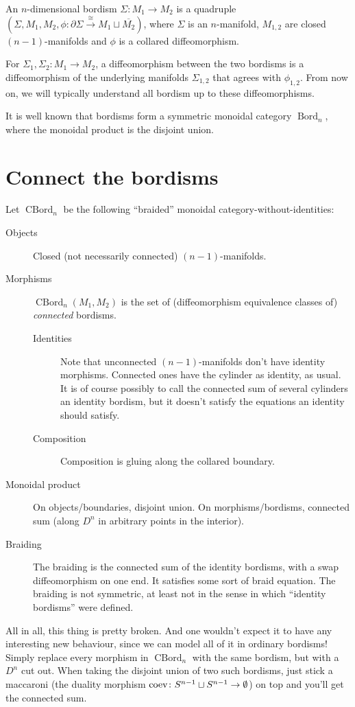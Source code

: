 \documentclass[a4paper]{article}
\begin{document}
\begin{definition}
	An $n$-dimensional bordism $\Sigma\colon M_1 \to M_2$ is a quadruple $(\Sigma, M_1, M_2, \phi\colon \partial \Sigma \xrightarrow{\cong} M_1 \sqcup \overline{M_2})$,
	where $\Sigma$ is an $n$-manifold, $M_{1,2}$ are closed $(n-1)$-manifolds and $\phi$ is a collared diffeomorphism.
	
	For $\Sigma_1, \Sigma_2\colon M_1 \to M_2$,
	a diffeomorphism between the two bordisms is a diffeomorphism of the underlying manifolds $\Sigma_{1,2}$ that agrees with $\phi_{1,2}$.
	From now on, we will typically understand all bordism up to these diffeomorphisms.
\end{definition}
It is well known that bordisms form a symmetric monoidal category $\operatorname{Bord}_n$,
where the monoidal product is the disjoint union.

\section{Connect the bordisms}
\label{sec:connect bordisms}

\begin{definition}
	Let $\operatorname{CBord}_n$ be the following ``braided'' monoidal category-without-identities:
	\begin{description}
		\item[Objects]
			Closed (not necessarily connected) $(n-1)$-manifolds.
		\item[Morphisms]
			$\operatorname{CBord}_n(M_1, M_2)$ is the set of (diffeomorphism equivalence classes of) \emph{connected} bordisms.
			\begin{description}
				\item[Identities]
					Note that unconnected $(n-1)$-manifolds don't have identity morphisms.
					Connected ones have the cylinder as identity, as usual.
					It is of course possibly to call the connected sum of several cylinders an identity bordism,
					but it doesn't satisfy the equations an identity should satisfy.
				\item[Composition]
					Composition is gluing along the collared boundary.
			\end{description}
		\item[Monoidal product]
			On objects/boundaries, disjoint union.
			On morphisms/bordisms, connected sum (along $D^n$ in arbitrary points in the interior).
		\item[Braiding]
			The braiding is the connected sum of the identity bordisms,
			with a swap diffeomorphism on one end.
			It satisfies some sort of braid equation.
			The braiding is not symmetric, at least not in the sense in which ``identity bordisms'' were defined.
	\end{description}
\end{definition}
All in all, this thing is pretty broken.
And one wouldn't expect it to have any interesting new behaviour,
since we can model all of it in ordinary bordisms!
Simply replace every morphism in $\operatorname{CBord}_n$ with the same bordism,
but with a $D^n$ cut out.
When taking the disjoint union of two such bordisms,
just stick a maccaroni (the duality morphism $\operatorname{coev}\colon S^{n-1} \sqcup S^{n-1} \to \emptyset$) on top and you'll get the connected sum.
\end{document}
